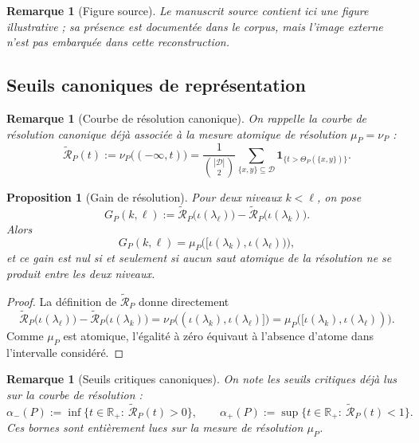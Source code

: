 \documentclass[11pt,a4paper,openany]{book}
\newtheorem{proposition}[definition]{Proposition}
\newtheorem{remark}[definition]{Remarque}
\begin{document}
\begin{remark}[Figure source]
Le manuscrit source contient ici une figure illustrative ; sa présence est documentée dans le corpus, mais l'image externe n'est pas embarquée dans cette reconstruction.
\end{remark}

\subsection{Seuils canoniques de représentation}

\begin{remark}[Courbe de résolution canonique]
On rappelle la courbe de résolution canonique déjà associée à la mesure atomique de résolution \(\mu_P=\nu_P\) :
\[
\widetilde{\mathcal R}_P(t)
:=
\nu_P\bigl((-\infty,t)\bigr)
=
\frac{1}{\binom{|\mathcal D|}{2}}
\sum_{\{x,y\}\subseteq\mathcal D}
\mathbf 1_{\{t>\Theta_P(\{x,y\})\}}.
\]
\end{remark}

\begin{proposition}[Gain de résolution]
Pour deux niveaux \(k<\ell\), on pose
\[
G_P(k,\ell):=
\widetilde{\mathcal R}_P\bigl(\iota(\lambda_\ell)\bigr)
-
\widetilde{\mathcal R}_P\bigl(\iota(\lambda_k)\bigr).
\]
Alors
\[
G_P(k,\ell)=\mu_P\bigl([\iota(\lambda_k),\iota(\lambda_\ell))\bigr),
\]
et ce gain est nul si et seulement si aucun saut atomique de la résolution ne se produit entre les deux niveaux.
\end{proposition}

\begin{proof}
La définition de \(\widetilde{\mathcal R}_P\) donne directement
\[
\widetilde{\mathcal R}_P\bigl(\iota(\lambda_\ell)\bigr)-\widetilde{\mathcal R}_P\bigl(\iota(\lambda_k)\bigr)
=
\nu_P\bigl((\iota(\lambda_k),\iota(\lambda_\ell)]\bigr)
=
\mu_P\bigl([\iota(\lambda_k),\iota(\lambda_\ell))\bigr).
\]
Comme \(\mu_P\) est atomique, l'égalité à zéro équivaut à l'absence d'atome dans l'intervalle considéré.
\end{proof}

\begin{remark}[Seuils critiques canoniques]
On note les seuils critiques déjà lus sur la courbe de résolution :
\[
\alpha_-(P):=\inf\{t\in\mathbb R_+:\ \widetilde{\mathcal R}_P(t)>0\},
\qquad
\alpha_+(P):=\sup\{t\in\mathbb R_+:\ \widetilde{\mathcal R}_P(t)<1\}.
\]
Ces bornes sont entièrement lues sur la mesure de résolution \(\mu_P\).
\end{remark}
\end{document}
